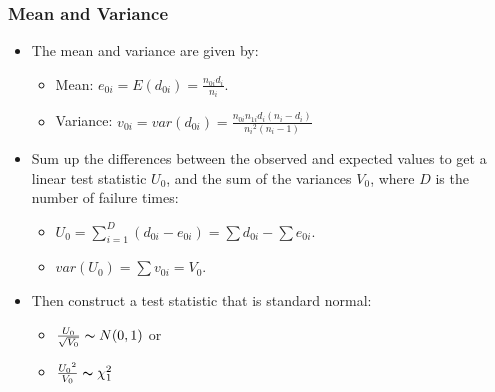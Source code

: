 \documentclass{beamer}
\begin{document}
\pagebreak
\begin{frame}
\frametitle{Mean and Variance}
\begin{itemize}
\item The mean and variance are given by:
\begin{itemize}
\item Mean: $e_{0i} = E(d_{0i}) = \frac{n_{0i}d_i}{n_i}$.
\item Variance: $v_{0i} = var(d_{0i}) = \frac{n_{0i}n_{1i}d_i(n_i-d_i)}{{n_i}^{2}(n_i - 1)}$
\end{itemize}
\item Sum up the differences between the observed  and expected values to get a linear test statistic $U_0$, and the sum of the variances $V_0$, where {\color{red}$D$ is the number of failure times}:
\begin{itemize}
		\item $U_0=\sum\limits_{i=1}^{D}(d_{0i}-e_{0i})=\sum d_{0i} - \sum e_{0i}$.
		\item $var(U_0)=\sum v_{0i}=V_0$.
\end{itemize}
\item Then construct a test statistic that is standard normal:
\begin{itemize}
\item $\frac{U_0}{\sqrt{V_0}} \thicksim N(0,1)$ or
\item $\frac{{U_0}^{2}}{V_0} \thicksim \chi _{1}^{2}$
\end{itemize}
\end{itemize}
\end{frame}
\end{document}
